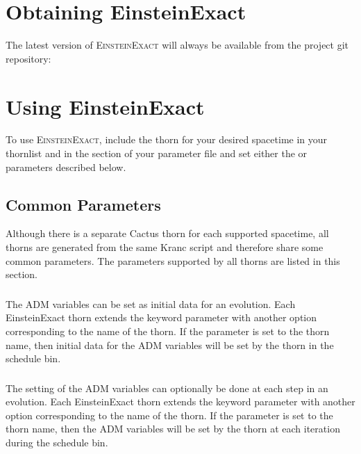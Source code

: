 \documentclass{article}
\begin{document}
\section{Obtaining EinsteinExact}
The latest version of \textsc{EinsteinExact} will always be available from the
project git repository:


\section{Using EinsteinExact}
To use \textsc{EinsteinExact}, include the thorn for your desired spacetime in your
thornlist and in the  section of your parameter file and set either
the  or 
parameters described below.

\subsection{Common Parameters}
Although there is a separate Cactus thorn for each supported spacetime, all
thorns are generated from the same Kranc script and therefore share some
common parameters. The parameters supported by all thorns are listed in this
section.

\subsubsection{}
The ADM variables can be set as initial data for an evolution. Each
EinsteinExact thorn extends the 
keyword parameter with another option corresponding to the name of the thorn.
If the parameter is set to the thorn name, then initial data for the ADM
variables will be set by the thorn in the  schedule
bin.

\subsubsection{}
The setting of the ADM variables can optionally be done at each step in an
evolution. Each EinsteinExact thorn extends the 
keyword parameter with another option corresponding to the name of the thorn.
If the parameter is set to the thorn name, then the ADM variables will be set
by the thorn at each iteration during the  schedule bin.
\end{document}
